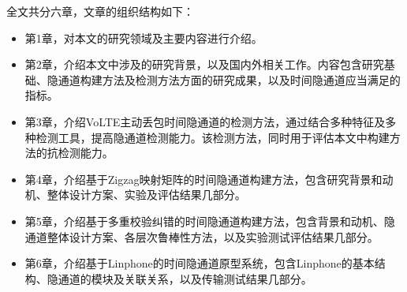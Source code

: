 全文共分六章，文章的组织结构如下：
\begin{itemize}
    \item 第1章，对本文的研究领域及主要内容进行介绍。
    \item 第2章，介绍本文中涉及的研究背景，以及国内外相关工作。内容包含研究基础、隐通道构建方法及检测方法方面的研究成果，以及时间隐通道应当满足的指标。
    \item 第3章，介绍VoLTE主动丢包时间隐通道的检测方法，通过结合多种特征及多种检测工具，提高隐通道检测能力。该检测方法，同时用于评估本文中构建方法的抗检测能力。
    \item 第4章，介绍基于Zigzag映射矩阵的时间隐通道构建方法，包含研究背景和动机、整体设计方案、实验及评估结果几部分。
    \item 第5章，介绍基于多重校验纠错的时间隐通道构建方法，包含背景和动机、隐通道整体设计方案、各层次鲁棒性方法，以及实验测试评估结果几部分。
    \item 第6章，介绍基于Linphone的时间隐通道原型系统，包含Linphone的基本结构、隐通道的模块及关联关系，以及传输测试结果几部分。
\end{itemize}